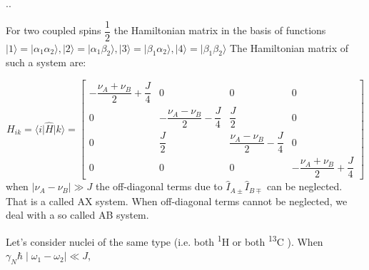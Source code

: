\documentclass{beamer}
\begin{document}
\begin{frame}{\thesection.\thesubsection. \insertsubsection}


		For two coupled spins $\dfrac{1}{2}$ the Hamiltonian matrix in the basis of functions $\vert 1 \rangle =  \vert \alpha_1 \alpha_2 \rangle, \vert 2 \rangle =  \vert \alpha_1 \beta_2 \rangle, \vert 3 \rangle =  \vert \beta_1 \alpha_2 \rangle, \vert 4 \rangle =  \vert \beta_1 \beta_2 \rangle$
		The Hamiltonian matrix of such a system are:
		
		{\tiny
		\begin{equation}
		  H_{ik}= \langle i \vert \hat{H} \vert k \rangle = 
		   \begin{bmatrix}
                 -\dfrac{\nu_A+ \nu_{B}  }{2} + \dfrac{J}{4}   & 0 & 0 & 0 \\
                 0 & -\dfrac{\nu_A-\nu_B}{2} - \dfrac{J}{4}  & \dfrac{J}{2} & 0 \\
                 0 & \dfrac{J}{2} & \dfrac{\nu_A-\nu_B}{2} - \dfrac{J}{4}  & 0 \\
                 0 & 0 & 0 & -\dfrac{\nu_A+\nu_B}{2} + \dfrac{J}{4}                  
		   \end{bmatrix}
		\end{equation}
	    }%
	    when $\mid \nu_A -\nu_B \mid \gg J $ the off-diagonal terms due to $\hat{I}_{A\pm} \hat{I}_{B\mp}$ can be neglected. That is a called \alert{AX system}. When off-diagonal terms cannot be neglected, we deal with a so called \alert{AB system}.
	
		
		Let's consider nuclei of the same type (i.e. both \textsuperscript{1}H or both \textsuperscript{13}C ). When $\gamma_N \hbar \mid \omega_1 -\omega_2 \mid \ll J $,
		

	
	
\end{frame}
\end{document}
